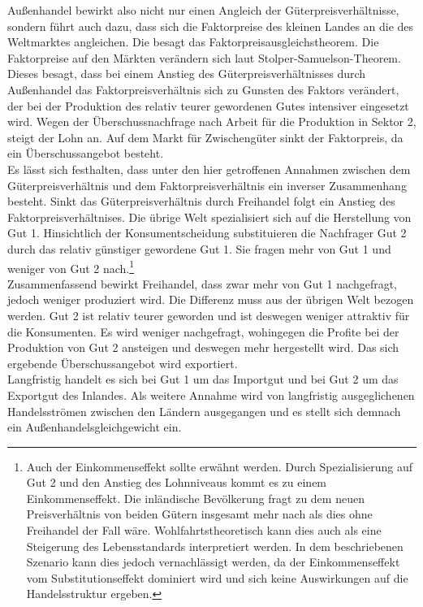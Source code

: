Außenhandel bewirkt also nicht nur einen Angleich der Güterpreisverhältnisse, sondern führt auch dazu, dass sich die Faktorpreise des kleinen Landes an die des Weltmarktes angleichen. Die besagt das Faktorpreisausgleichstheorem. Die Faktorpreise auf den Märkten verändern sich laut Stolper-Samuelson-Theorem. Dieses besagt, dass bei einem Anstieg des Güterpreisverhältnisses durch Außenhandel das Faktorpreisverhältnis sich zu Gunsten des Faktors verändert, der bei der Produktion des relativ teurer gewordenen Gutes intensiver eingesetzt wird. Wegen der Überschussnachfrage nach Arbeit für die Produktion in Sektor 2, steigt der Lohn an. Auf dem Markt für Zwischengüter sinkt der Faktorpreis, da ein Überschussangebot besteht.\\


Es lässt sich festhalten, dass unter den hier getroffenen Annahmen zwischen dem Güterpreisverhältnis und dem Faktorpreisverhältnis ein inverser Zusammenhang besteht. Sinkt das Güterpreisverhältnis durch Freihandel folgt ein Anstieg des Faktorpreisverhältnises. Die übrige Welt spezialisiert sich auf die Herstellung von Gut 1. Hinsichtlich der Konsumentscheidung substituieren die Nachfrager Gut 2 durch das relativ günstiger gewordene Gut 1. Sie fragen mehr von Gut 1 und weniger von Gut 2 nach.\footnote{Auch der Einkommenseffekt sollte erwähnt werden. Durch Spezialisierung auf Gut 2 und den Anstieg des Lohnniveaus kommt es zu einem Einkommenseffekt. Die inländische Bevölkerung fragt zu dem neuen Preisverhältnis von beiden Gütern insgesamt mehr nach als dies ohne Freihandel der Fall wäre. Wohlfahrtstheoretisch kann dies auch als eine Steigerung des Lebensstandards interpretiert werden. In dem beschriebenen Szenario kann dies jedoch vernachlässigt werden, da der Einkommenseffekt vom Substitutionseffekt dominiert wird und sich keine Auswirkungen auf die Handelsstruktur ergeben.} \\


Zusammenfassend bewirkt Freihandel, dass zwar mehr von Gut 1 nachgefragt, jedoch weniger produziert wird. Die Differenz muss aus der übrigen Welt bezogen werden. Gut 2 ist relativ teurer geworden und ist deswegen weniger attraktiv für die Konsumenten. Es wird weniger nachgefragt, wohingegen die Profite bei der Produktion von Gut 2 ansteigen und deswegen mehr hergestellt wird. Das sich ergebende Überschussangebot wird exportiert.\\
Langfristig handelt es sich bei Gut 1 um das Importgut und bei Gut 2 um das Exportgut des Inlandes. Als weitere Annahme wird von langfristig ausgeglichenen Handelsströmen zwischen den Ländern ausgegangen und es stellt sich demnach ein Außenhandelsgleichgewicht ein. 


